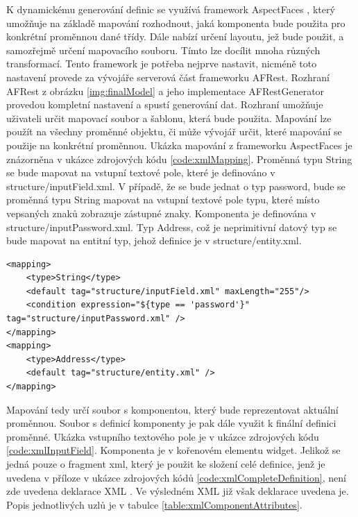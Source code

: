 K dynamickému generování definic se využívá framework AspectFaces \cite{aspectFaces}, který umožňuje na základě mapování rozhodnout, jaká komponenta bude použita pro konkrétní proměnnou dané třídy. Dále nabízí určení layoutu, jež bude použit, a samozřejmě určení mapovacího souboru. Tímto lze docílit mnoha různých transformací. Tento framework je potřeba nejprve nastavit, nicméně toto nastavení provede za vývojáře serverová část frameworku AFRest. Rozhraní AFRest z obrázku \ref{img:finalModel} a jeho implementace AFRestGenerator provedou kompletní nastavení a spustí generování dat. Rozhraní umožňuje uživateli určit mapovací soubor a šablonu, která bude použita. Mapování lze použít na všechny proměnné objektu, či může vývojář určit, které mapování se použije na konkrétní proměnnou. Ukázka mapování z frameworku AspectFaces je znázorněna v ukázce zdrojových kódu \ref{code:xmlMapping}. Proměnná typu String se bude mapovat na vstupní textové pole, které je definováno v structure/inputField.xml. V případě, že se bude jednat o typ password, bude se proměnná typu String mapovat na vstupní textové pole typu, které místo vepsaných znaků zobrazuje zástupné znaky. Komponenta je definována v structure/inputPassword.xml. Typ Address, což je neprimitivní datový typ se bude mapovat na entitní typ, jehož definice je v structure/entity.xml.
\begin{lstlisting}[caption=Ukázka mapování proměnných na komponenty,
label={code:xmlMapping}, basicstyle=\footnotesize]
<mapping>
	<type>String</type>
	<default tag="structure/inputField.xml" maxLength="255"/>
	<condition expression="${type == 'password'}" tag="structure/inputPassword.xml" />
</mapping>
<mapping>
	<type>Address</type>
	<default tag="structure/entity.xml" />
</mapping>
\end{lstlisting}

Mapování tedy určí soubor s komponentou, který bude reprezentovat aktuální proměnnou. Soubor s definicí komponenty je pak dále využit k finální definici proměnné. Ukázka vstupního textového pole je v ukázce zdrojových kódu \ref{code:xmlInputField}. Komponenta je v kořenovém elementu widget. Jelikož se jedná pouze o fragment xml, který je použit ke složení celé definice, jenž je uvedena v příloze v ukázce zdrojových kódů \ref{code:xmlCompleteDefinition}, není zde uvedena deklarace XML \cite{xml}. Ve výsledném XML již však deklarace uvedena je. Popis jednotlivých uzlů je v tabulce \ref{table:xmlComponentAttributes}.

